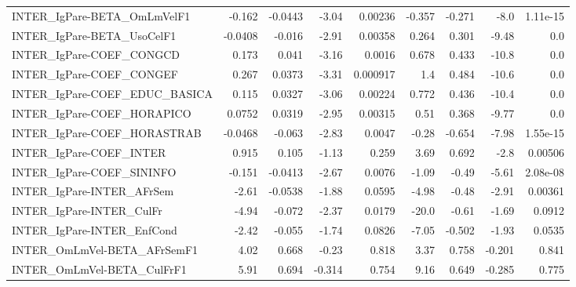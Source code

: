 \begin{tabular}{lrrrrrrrr}
INTER\_IgPare-BETA\_OmLmVelF1           &      -0.162 &      -0.0443 &    -3.04 &  0.00236 &     -0.357 &      -0.271 &         -8.0 &      1.11e-15 \\
INTER\_IgPare-BETA\_UsoCelF1            &     -0.0408 &       -0.016 &    -2.91 &  0.00358 &      0.264 &       0.301 &        -9.48 &           0.0 \\
INTER\_IgPare-COEF\_CONGCD              &       0.173 &        0.041 &    -3.16 &   0.0016 &      0.678 &       0.433 &        -10.8 &           0.0 \\
INTER\_IgPare-COEF\_CONGEF              &       0.267 &       0.0373 &    -3.31 & 0.000917 &        1.4 &       0.484 &        -10.6 &           0.0 \\
INTER\_IgPare-COEF\_EDUC\_BASICA         &       0.115 &       0.0327 &    -3.06 &  0.00224 &      0.772 &       0.436 &        -10.4 &           0.0 \\
INTER\_IgPare-COEF\_HORAPICO            &      0.0752 &       0.0319 &    -2.95 &  0.00315 &       0.51 &       0.368 &        -9.77 &           0.0 \\
INTER\_IgPare-COEF\_HORASTRAB           &     -0.0468 &       -0.063 &    -2.83 &   0.0047 &      -0.28 &      -0.654 &        -7.98 &      1.55e-15 \\
INTER\_IgPare-COEF\_INTER               &       0.915 &        0.105 &    -1.13 &    0.259 &       3.69 &       0.692 &         -2.8 &       0.00506 \\
INTER\_IgPare-COEF\_SININFO             &      -0.151 &      -0.0413 &    -2.67 &   0.0076 &      -1.09 &       -0.49 &        -5.61 &      2.08e-08 \\
INTER\_IgPare-INTER\_AFrSem             &       -2.61 &      -0.0538 &    -1.88 &   0.0595 &      -4.98 &       -0.48 &        -2.91 &       0.00361 \\
INTER\_IgPare-INTER\_CulFr              &       -4.94 &       -0.072 &    -2.37 &   0.0179 &      -20.0 &       -0.61 &        -1.69 &        0.0912 \\
INTER\_IgPare-INTER\_EnfCond            &       -2.42 &       -0.055 &    -1.74 &   0.0826 &      -7.05 &      -0.502 &        -1.93 &        0.0535 \\
INTER\_OmLmVel-BETA\_AFrSemF1           &        4.02 &        0.668 &    -0.23 &    0.818 &       3.37 &       0.758 &       -0.201 &         0.841 \\
INTER\_OmLmVel-BETA\_CulFrF1            &        5.91 &        0.694 &   -0.314 &    0.754 &       9.16 &       0.649 &       -0.285 &         0.775 \\

\end{tabular}
